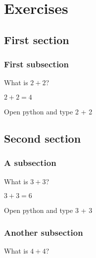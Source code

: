 \documentclass{book}
\begin{document}
\chapter{Exercises}

\section{First section}

\subsection{First subsection}

\begin{exercise}[subtitle={Simple Addition}]
  What is \(2 + 2\)?
\end{exercise}

\begin{solution}
  \(2 + 2 = 4\)
\end{solution}

\begin{additionalinformation}
Open python and type 2 + 2
\end{additionalinformation}

\section{Second section}

\subsection{A subsection}

\begin{exercise}[examdate={January 15, 2020}, examproblemnumber={1}, examproblemid={2020-01-15-01}]
  What is \(3 + 3\)?
\end{exercise}

\begin{solution}
  \(3 + 3 = 6\)
\end{solution}

\begin{additionalinformation}
Open python and type 3 + 3
\end{additionalinformation}

\subsection{Another subsection}

\begin{exercise}
  What is \(4 + 4\)?
\end{exercise}
\end{document}
